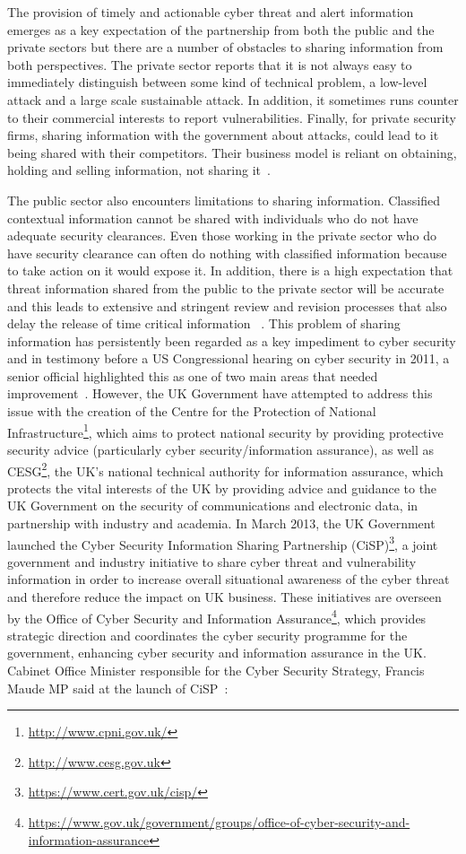 \documentclass[a4paper,11pt]{article}
\begin{document}
The provision of timely and actionable cyber threat and alert
information emerges as a key expectation of the partnership from both
the public and the private sectors but there are a number of obstacles
to sharing information from both perspectives.  The private sector
reports that it is not always easy to immediately distinguish between
some kind of technical problem, a low-level attack and a large scale
sustainable attack.  In addition, it sometimes runs counter to their
commercial interests to report vulnerabilities. Finally, for private
security firms, sharing information with the government about attacks,
could lead to it being shared with their competitors. Their business
model is reliant on obtaining, holding and selling information, not
sharing it~\cite{usgao:2010}.

The public sector also encounters limitations to sharing
information. Classified contextual information cannot be shared with
individuals who do not have adequate security clearances. Even those
working in the private sector who do have security clearance can often
do nothing with classified information because to take action on it
would expose it. In addition, there is a high expectation that threat
information shared from the public to the private sector will be
accurate and this leads to extensive and stringent review and revision
processes that also delay the release of time critical information
~\cite{usgao:2010}.  This problem of sharing information has
persistently been regarded as a key impediment to cyber security and
in testimony before a US Congressional hearing on cyber security in
2011, a senior official highlighted this as one of two main areas that
needed improvement~\cite{wilshusen:2011}. However, the UK Government
have attempted to address this issue with the creation of the Centre
for the Protection of National
Infrastructure\footnote{\url{http://www.cpni.gov.uk/}}, which aims to
protect national security by providing protective security advice
(particularly cyber security/information assurance), as well as
CESG\footnote{\url{http://www.cesg.gov.uk}}, the UK's national
technical authority for information assurance, which protects the
vital interests of the UK by providing advice and guidance to the UK
Government on the security of communications and electronic data, in
partnership with industry and academia. In March 2013, the UK
Government launched the Cyber Security Information Sharing Partnership
(CiSP)\footnote{\url{https://www.cert.gov.uk/cisp/}}, a joint
government and industry initiative to share cyber threat and
vulnerability information in order to increase overall situational
awareness of the cyber threat and therefore reduce the impact on UK
business. These initiatives are overseen by the Office of Cyber
Security and Information
Assurance\footnote{\url{https://www.gov.uk/government/groups/office-of-cyber-security-and-information-assurance}},
which provides strategic direction and coordinates the cyber security
programme for the government, enhancing cyber security and information
assurance in the UK. Cabinet Office Minister responsible for the Cyber
Security Strategy, Francis Maude MP said at the launch of
CiSP~\cite{caboff:2013}:
\end{document}
